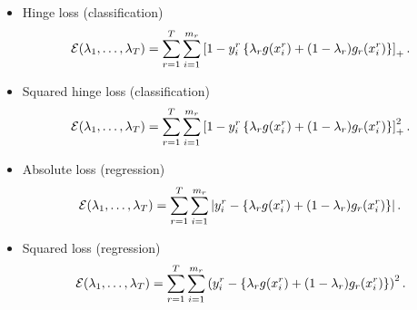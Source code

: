\begin{itemize}
    \item Hinge loss (classification)
    \begin{equation}
        \label{eq:hingeloss_emprisk}
        \mathcal{E}(\lambda_1, \ldots, \lambda_\ntasks) = \sum_{r=1}^\ntasks \sum_{i=1}^{\npertask_r} \pospart{1 - y_i^r \left\lbrace\lambda_r g(x_i^r) + (1 - \lambda_r) g_r(x_i^r) \right \rbrace} .
    \end{equation}
    \item Squared hinge loss (classification)
    \begin{equation}
        \label{eq:sqhingeloss_emprisk}
        \mathcal{E}(\lambda_1, \ldots, \lambda_\ntasks) = \sum_{r=1}^\ntasks \sum_{i=1}^{\npertask_r} \pospart{1 - y_i^r \left\lbrace\lambda_r g(x_i^r) + (1 - \lambda_r) g_r(x_i^r) \right \rbrace}^2 .
    \end{equation}
    \item Absolute loss (regression)
    \begin{equation}
        \label{eq:absloss_emprisk}
        \mathcal{E}(\lambda_1, \ldots, \lambda_\ntasks) = \sum_{r=1}^\ntasks \sum_{i=1}^{\npertask_r} \abs{y_i^r - \left\lbrace\lambda_r g(x_i^r) + (1 - \lambda_r) g_r(x_i^r) \right \rbrace} .
    \end{equation}
    \item Squared loss (regression)
    \begin{equation}
        \label{eq:sqloss_emprisk}
        \mathcal{E}(\lambda_1, \ldots, \lambda_\ntasks) = \sum_{r=1}^\ntasks \sum_{i=1}^{\npertask_r} \left( {y_i^r - \left\lbrace\lambda_r g(x_i^r) + (1 - \lambda_r) g_r(x_i^r) \right \rbrace} \right)^2 .
    \end{equation}
\end{itemize}
